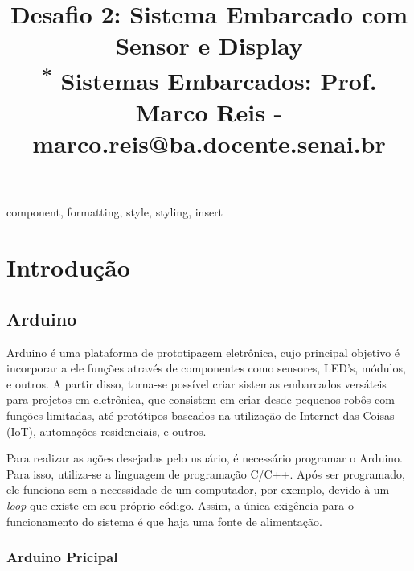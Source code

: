 \documentclass[conference]{IEEEtran}
\begin{document}
\title{Desafio 2: Sistema Embarcado com Sensor e Display\\
{\footnotesize \textsuperscript{*} Sistemas Embarcados: Prof. Marco Reis - marco.reis@ba.docente.senai.br}
}

\author{
}

\maketitle

\begin{abstract}

\end{abstract}
    
\begin{IEEEkeywords}
    component, formatting, style, styling, insert
\end{IEEEkeywords}
    
\section{Introdução}
\subsection{Arduino}

    Arduino é uma plataforma de prototipagem eletrônica, cujo principal objetivo é incorporar a ele 
funções através de componentes como sensores, LED's, módulos, e outros. A partir disso, torna-se 
possível criar sistemas embarcados versáteis para projetos em eletrônica, que consistem em criar desde 
pequenos robôs com funções limitadas, até protótipos baseados na utilização de Internet das Coisas (IoT),
automações residenciais, e outros.

    Para realizar as ações desejadas pelo usuário, é necessário programar o Arduino. Para isso, utiliza-se 
a linguagem de programação C/C++. Após ser programado, ele funciona sem a necessidade de um computador, por
exemplo, devido à um \emph{loop} que existe em seu próprio código. Assim, a única exigência para o
funcionamento do sistema é que haja uma fonte de alimentação.\\

\subsubsection{Arduino Pricipal}
\end{document}
